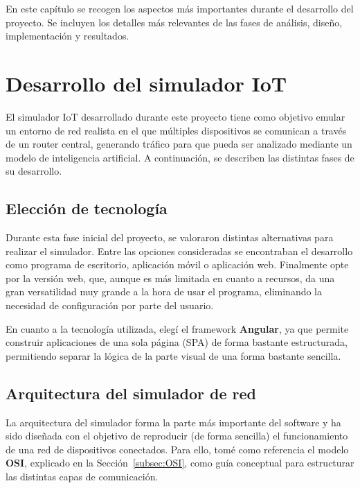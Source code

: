 
En este capítulo se recogen los aspectos más importantes durante el desarrollo del proyecto. Se incluyen los detalles más relevantes de las fases de análisis, diseño, implementación y resultados.

\section{Desarrollo del simulador IoT}
\label{sec:DesarolloSimuladorIot}
El simulador IoT desarrollado durante este proyecto tiene como objetivo emular un entorno de red realista en el que múltiples dispositivos se comunican a través de un router central, generando tráfico para que pueda ser analizado mediante un modelo de inteligencia artificial. A continuación, se describen las distintas fases de su desarrollo.

\subsection{Elección de tecnología}
\label{subsec:EleccionTecnologia}
Durante esta fase inicial del proyecto, se valoraron distintas alternativas para realizar el simulador. Entre las opciones consideradas se encontraban el desarrollo como programa de escritorio, aplicación móvil o aplicación web. Finalmente opte por la versión web, que, aunque es más limitada en cuanto a recursos, da una gran versatilidad muy grande a la hora de usar el programa, eliminando la necesidad de configuración por parte del usuario. 

En cuanto a la tecnología utilizada, elegí el framework \textbf{Angular}, ya que permite construir aplicaciones de una sola página (SPA) de forma bastante estructurada, permitiendo separar la lógica de la parte visual de una forma bastante sencilla.

\subsection{Arquitectura del simulador de red}
\label{subsec:ArquitecturaSimulador}
La arquitectura del simulador forma la parte más importante del software y ha sido diseñada con el objetivo de reproducir (de forma sencilla) el funcionamiento de una red de dispositivos conectados. Para ello, tomé como referencia el modelo \textbf{OSI}, explicado en la Sección~\ref{subsec:OSI}, como guía conceptual para estructurar las distintas capas de comunicación.

